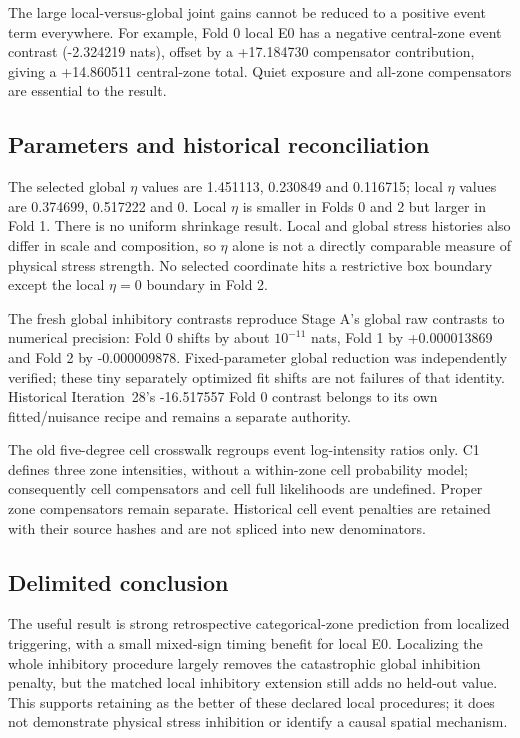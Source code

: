 The large local-versus-global joint gains cannot be reduced to a positive event term everywhere. For example, Fold 0 local E0 has a negative central-zone event contrast (-2.324219 nats), offset by a +17.184730 compensator contribution, giving a +14.860511 central-zone total. Quiet exposure and all-zone compensators are essential to the result.

\subsection{Parameters and historical reconciliation}

The selected global $\eta$ values are 1.451113, 0.230849 and 0.116715; local $\eta$ values are 0.374699, 0.517222 and 0. Local $\eta$ is smaller in Folds 0 and 2 but larger in Fold 1. There is no uniform shrinkage result. Local and global stress histories also differ in scale and composition, so $\eta$ alone is not a directly comparable measure of physical stress strength. No selected coordinate hits a restrictive box boundary except the local $\eta=0$ boundary in Fold 2.

The fresh global inhibitory contrasts reproduce Stage A's global raw contrasts to numerical precision: Fold 0 shifts by about $10^{-11}$ nats, Fold 1 by +0.000013869 and Fold 2 by -0.000009878. Fixed-parameter global reduction was independently verified; these tiny separately optimized fit shifts are not failures of that identity. Historical Iteration~28's -16.517557 Fold 0 contrast belongs to its own fitted/nuisance recipe and remains a separate authority.

The old five-degree cell crosswalk regroups event log-intensity ratios only. C1 defines three zone intensities, without a within-zone cell probability model; consequently cell compensators and cell full likelihoods are undefined. Proper zone compensators remain separate. Historical cell event penalties are retained with their source hashes and are not spliced into new denominators.

\subsection{Delimited conclusion}

The useful result is strong retrospective categorical-zone prediction from localized triggering, with a small mixed-sign timing benefit for local E0. Localizing the whole inhibitory procedure largely removes the catastrophic global inhibition penalty, but the matched local inhibitory extension still adds no held-out value. This supports retaining  as the better of these declared local procedures; it does not demonstrate physical stress inhibition or identify a causal spatial mechanism.

